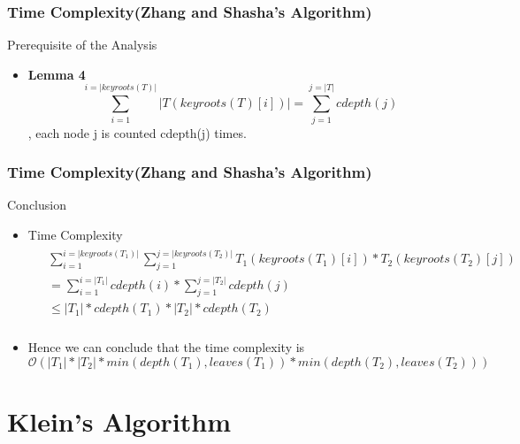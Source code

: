 \documentclass{beamer}
\begin{document}
\begin{frame}
\frametitle{Time Complexity(Zhang and Shasha's Algorithm)}
\begin{block}{Prerequisite of the Analysis}
\begin{itemize}
\item \textbf{Lemma 4} 
\begin{displaymath}
\sum_{i=1}^{i=\left\vert keyroots(T) \right\vert} \left\vert T(keyroots(T)[i]) \right\vert = \sum_{j=1}^{j=\left\vert T \right\vert}cdepth(j)
\end{displaymath}, each node j is counted cdepth(j) times.
\end{itemize}
\end{block}
\end{frame}

\begin{frame}
\frametitle{Time Complexity(Zhang and Shasha's Algorithm)}
\begin{block}{Conclusion}
\begin{itemize}
\item Time Complexity
\begin{eqnarray*}
\begin{split}
& \sum_{i=1}^{i=\left\vert keyroots(T_1) \right\vert}\sum_{j=1}^{j=\left\vert keyroots(T_2) \right\vert}T_1(keyroots(T_1)[i]) * T_2(keyroots(T_2)[j])\\
& =\sum_{i=1}^{i=\left\vert T_1 \right\vert}cdepth(i) * \sum_{j=1}^{j=\left\vert T_2 \right\vert}cdepth(j)\\ 
& \leq \left\vert T_1 \right\vert * cdepth(T_1) * \left\vert T_2 \right\vert * cdepth(T_2)\\
\end{split}
\end{eqnarray*}
\item Hence we can conclude that the time complexity is 
\begin{displaymath}
\mathcal{O}(\left\vert T_1 \right\vert * \left\vert T_2 \right\vert * min(depth(T_1), leaves(T_1)) * min(depth(T_2), leaves(T_2)))
\end{displaymath}
\end{itemize}
\end{block}
\end{frame}

\section{Klein's Algorithm}
\end{document}
